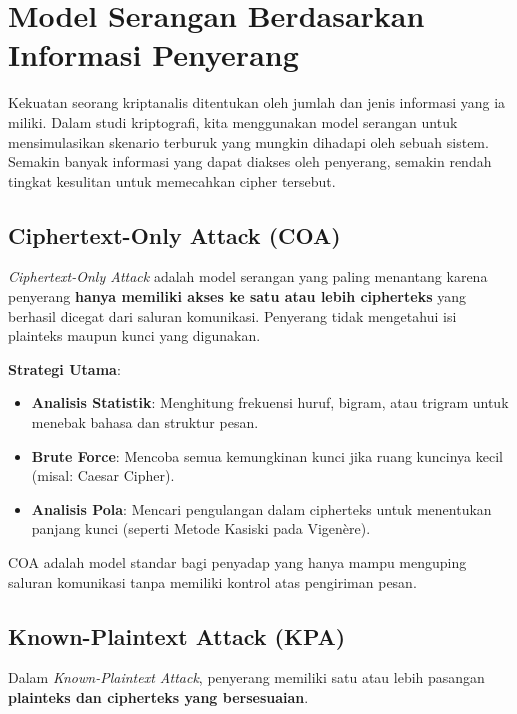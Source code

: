\section{Model Serangan Berdasarkan Informasi Penyerang}

Kekuatan seorang kriptanalis ditentukan oleh jumlah dan jenis informasi yang ia miliki. Dalam studi kriptografi, kita menggunakan model serangan untuk mensimulasikan skenario terburuk yang mungkin dihadapi oleh sebuah sistem. Semakin banyak informasi yang dapat diakses oleh penyerang, semakin rendah tingkat kesulitan untuk memecahkan cipher tersebut.

\subsection{Ciphertext-Only Attack (COA)}

\textit{Ciphertext-Only Attack} adalah model serangan yang paling menantang karena penyerang \textbf{hanya memiliki akses ke satu atau lebih cipherteks} yang berhasil dicegat dari saluran komunikasi. Penyerang tidak mengetahui isi plainteks maupun kunci yang digunakan.

\textbf{Strategi Utama}:
\begin{itemize}
    \item \textbf{Analisis Statistik}: Menghitung frekuensi huruf, bigram, atau trigram untuk menebak bahasa dan struktur pesan.
    \item \textbf{Brute Force}: Mencoba semua kemungkinan kunci jika ruang kuncinya kecil (misal: Caesar Cipher).
    \item \textbf{Analisis Pola}: Mencari pengulangan dalam cipherteks untuk menentukan panjang kunci (seperti Metode Kasiski pada Vigenère).
\end{itemize}
COA adalah model standar bagi penyadap yang hanya mampu menguping saluran komunikasi tanpa memiliki kontrol atas pengiriman pesan.

\subsection{Known-Plaintext Attack (KPA)}

Dalam \textit{Known-Plaintext Attack}, penyerang memiliki satu atau lebih pasangan \textbf{plainteks dan cipherteks yang bersesuaian}.

